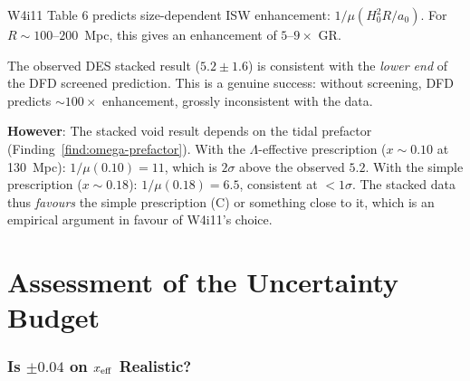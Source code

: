 \documentclass[11pt,a4paper]{article}
\newcommand{\Hzero}{H_0}
\newcommand{\aM}{a_0}
\newcommand{\mufd}{\mu}
\begin{document}
W4i11 Table 6 predicts size-dependent ISW enhancement:
$1/\mufd(\Hzero^2 R/\aM)$. For $R \sim 100$--$200$~Mpc, this
gives an enhancement of $5$--$9\times$ GR.

The observed DES stacked result ($5.2 \pm 1.6$) is consistent with
the \emph{lower end} of the DFD screened prediction. This is a
genuine success: without screening, DFD predicts $\sim 100\times$
enhancement, grossly inconsistent with the data.

\textbf{However}: The stacked void result depends on the tidal
prefactor (Finding~\ref{find:omega-prefactor}). With the
$\Lambda$-effective prescription ($x \sim 0.10$ at 130~Mpc):
$1/\mufd(0.10) = 11$, which is $2\sigma$ above the observed $5.2$.
With the simple prescription ($x \sim 0.18$): $1/\mufd(0.18) = 6.5$,
consistent at $<1\sigma$. The stacked data thus \emph{favours}
the simple prescription (C) or something close to it, which is
an empirical argument in favour of W4i11's choice.


\part{Assessment of the Uncertainty Budget}
\label{part:uncertainty}


\section{Is $\pm 0.04$ on $x_{\rm eff}$ Realistic?}
\label{sec:uncertainty-xeff}
\end{document}

